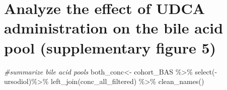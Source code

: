 \documentclass[
]{book}
\newenvironment{Shaded}{\begin{snugshade}}{\end{snugshade}}
\newcommand{\CommentTok}[1]{\textcolor[rgb]{0.56,0.35,0.01}{\textit{#1}}}
\newcommand{\FunctionTok}[1]{\textcolor[rgb]{0.00,0.00,0.00}{#1}}
\newcommand{\NormalTok}[1]{#1}
\newcommand{\OtherTok}[1]{\textcolor[rgb]{0.56,0.35,0.01}{#1}}
\newcommand{\SpecialCharTok}[1]{\textcolor[rgb]{0.00,0.00,0.00}{#1}}
\begin{document}
\hypertarget{analyze-the-effect-of-udca-administration-on-the-bile-acid-pool-supplementary-figure-5}{%
\chapter{Analyze the effect of UDCA administration on the bile acid pool (supplementary figure 5)}\label{analyze-the-effect-of-udca-administration-on-the-bile-acid-pool-supplementary-figure-5}}

\begin{Shaded}
\begin{Highlighting}[]
\CommentTok{\#summarize bile acid pools}
\NormalTok{both\_conc}\OtherTok{\textless{}{-}}\NormalTok{ cohort\_BAS }\SpecialCharTok{\%\textgreater{}\%} \FunctionTok{select}\NormalTok{(}\SpecialCharTok{{-}}\NormalTok{ursodiol)}\SpecialCharTok{\%\textgreater{}\%}
  \FunctionTok{left\_join}\NormalTok{(conc\_all\_filtered) }\SpecialCharTok{\%\textgreater{}\%} \FunctionTok{clean\_names}\NormalTok{()}


\end{Highlighting}
\end{Shaded}
\end{document}
